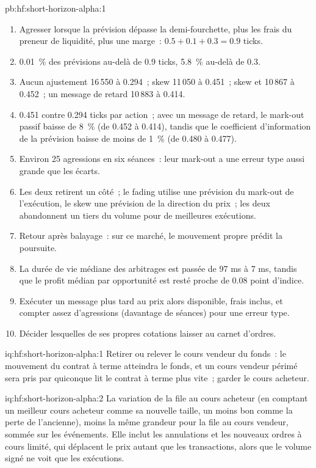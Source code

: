 \begin{solution}{pb:hf:short-horizon-alpha:1}
\begin{enumerate}
\item Agresser lorsque la prévision dépasse la demi-fourchette, plus les frais du preneur de liquidité, plus une marge~: $0.5+0.1+0.3=0.9$ ticks.
\item 0.01~\% des prévisions au-delà de 0.9 ticks, 5.8~\% au-delà de 0.3.
\item Aucun ajustement 16\,550 à 0.294~; skew 11\,050 à 0.451~; skew et  10\,867 à 0.452~; un message de retard 10\,883 à 0.414.
\item 0.451 contre 0.294 ticks par action~; avec un message de retard, le mark-out passif baisse de 8~\% (de 0.452 à 0.414), tandis que le
coefficient d'information de la prévision baisse de moins de 1~\% (de 0.480 à 0.477).
\item Environ 25 agressions en six séances~: leur mark-out a une erreur type aussi grande que les écarts.
\item Les deux retirent un côté~; le fading utilise une prévision du mark-out de l'exécution, le skew une prévision de la direction du prix~; les deux abandonnent un tiers du
volume pour de meilleures exécutions.
\item Retour après balayage~: sur ce marché, le mouvement propre prédit la poursuite.
\item La durée de vie médiane des arbitrages est passée de 97 ms à 7 ms, tandis que le profit médian par opportunité est resté proche de 0.08 point d'indice.
\item Exécuter un message plus tard au prix alors disponible, frais inclus, et compter assez d'agressions (davantage de séances) pour une erreur type.
\item Décider lesquelles de ses propres cotations laisser au carnet d'ordres.
\end{enumerate}
\end{solution}

\begin{solution}{iq:hf:short-horizon-alpha:1}
Retirer ou relever le cours vendeur du fonds~: le mouvement du contrat à terme atteindra le fonds, et un cours vendeur périmé sera pris par quiconque lit le contrat à terme plus vite~; garder le
cours acheteur.
\end{solution}

\begin{solution}{iq:hf:short-horizon-alpha:2}
La variation de la file au cours acheteur (en comptant un meilleur cours acheteur comme sa nouvelle taille, un moins bon comme la perte de l'ancienne), moins la même grandeur pour la file au cours vendeur, sommée sur
les événements. Elle inclut les annulations et les nouveaux ordres à cours limité, qui déplacent le prix autant que les transactions, alors que le volume signé ne voit que les exécutions.
\end{solution}

